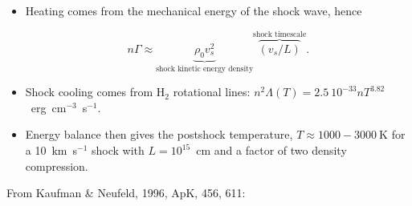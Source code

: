 


\begin{itemize}

\item Heating comes from the mechanical energy of the shock wave,
  hence

\[ n \Gamma \approx  \underbrace{\rho_0 v_s^2}_{\text{shock kinetic energy
  density}} \overbrace{(v_s / L)}^{\text{shock timescale}} . \]

\item Shock cooling comes from H$_2$ rotational lines:
$ n^2 \Lambda(T) = 2.5~10^{-33} n T^{3.82}$~erg~cm$^{-3}$~s$^{-1}$. 

\item Energy balance then gives the postshock temperature, $T \approx
  1000-3000~$K for a 10~km~s$^{-1}$ shock with $L = 10^{15}$~cm and a
  factor of two density compression. 


\end{itemize}


From Kaufman \& Neufeld, 1996, ApK, 456, 611:



